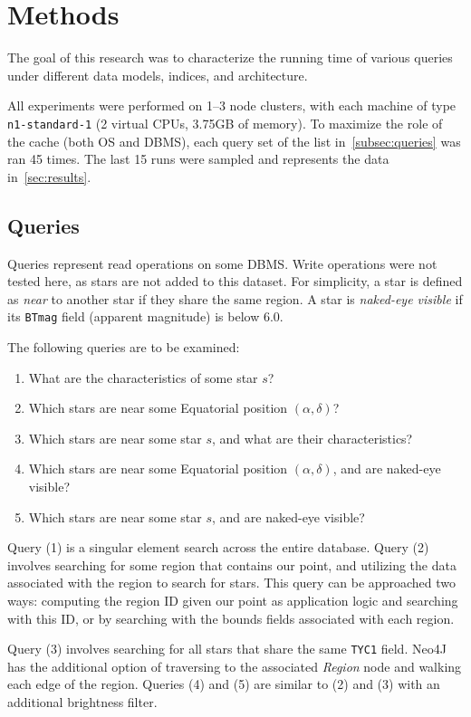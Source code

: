 \section{Methods}\label{sec:methods}
The goal of this research was to characterize the running time of various queries under different data models, indices,
and architecture.

All experiments were performed on 1--3 node clusters, with each machine of type \texttt{n1-standard-1} (2 virtual CPUs,
3.75GB of memory).
To maximize the role of the cache (both OS and DBMS), each query set of the list in~\autoref{subsec:queries} was ran
45 times.
The last 15 runs were sampled and represents the data in~\autoref{sec:results}.

\subsection{Queries}\label{subsec:queries}
Queries represent read operations on some DBMS\@.
Write operations were not tested here, as stars are not added to this dataset.
For simplicity, a star is defined as \textit{near} to another star if they share the same region.
A star is \textit{naked-eye visible} if its \texttt{BTmag} field (apparent magnitude) is below 6.0.

The following queries are to be examined:
\begin{enumerate}
    \item What are the characteristics of some star $s$?
    \item Which stars are near some Equatorial position $(\alpha, \delta)$?
    \item Which stars are near some star $s$, and what are their characteristics?
    \item Which stars are near some Equatorial position $(\alpha, \delta)$, and are naked-eye visible?
    \item Which stars are near some star $s$, and are naked-eye visible?
\end{enumerate}

Query (1) is a singular element search across the entire database.
Query (2) involves searching for some region that contains our point, and utilizing the data associated with the
region to search for stars.
This query can be approached two ways: computing the region ID given our point as application logic and searching with
this ID, or by searching with the bounds fields associated with each region.

Query (3) involves searching for all stars that share the same \texttt{TYC1} field.
Neo4J has the additional option of traversing to the associated \textit{Region} node and walking each edge of the
region.
Queries (4) and (5) are similar to (2) and (3) with an additional brightness filter.

